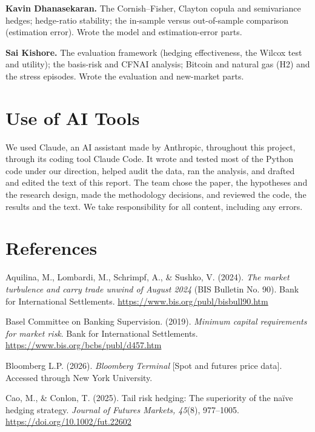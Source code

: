 \documentclass[11pt,letterpaper]{article}
\begin{document}
\textbf{Kavin Dhanasekaran.} The Cornish–Fisher, Clayton copula and semivariance hedges; hedge-ratio stability; the in-sample versus out-of-sample comparison (estimation error). Wrote the model and estimation-error parts.

\textbf{Sai Kishore.} The evaluation framework (hedging effectiveness, the Wilcox test and utility); the basis-risk and CFNAI analysis; Bitcoin and natural gas (H2) and the stress episodes. Wrote the evaluation and new-market parts.

\section*{Use of AI Tools}

We used Claude, an AI assistant made by Anthropic, throughout this project, through its coding tool Claude Code. It wrote and tested most of the Python code under our direction, helped audit the data, ran the analysis, and drafted and edited the text of this report. The team chose the paper, the hypotheses and the research design, made the methodology decisions, and reviewed the code, the results and the text. We take responsibility for all content, including any errors.

\section*{References}

{\small\setlength{\parskip}{0pt}\hangindent=0.3in\noindent Aquilina, M., Lombardi, M., Schrimpf, A., \& Sushko, V. (2024). \textit{The market turbulence and carry trade unwind of August 2024} (BIS Bulletin No. 90). Bank for International Settlements. \url{https://www.bis.org/publ/bisbull90.htm}\par}

{\small\setlength{\parskip}{0pt}\hangindent=0.3in\noindent Basel Committee on Banking Supervision. (2019). \textit{Minimum capital requirements for market risk}. Bank for International Settlements. \url{https://www.bis.org/bcbs/publ/d457.htm}\par}

{\small\setlength{\parskip}{0pt}\hangindent=0.3in\noindent Bloomberg L.P. (2026). \textit{Bloomberg Terminal} [Spot and futures price data]. Accessed through New York University.\par}

{\small\setlength{\parskip}{0pt}\hangindent=0.3in\noindent Cao, M., \& Conlon, T. (2025). Tail risk hedging: The superiority of the naïve hedging strategy. \textit{Journal of Futures Markets, 45}(8), 977–1005. \url{https://doi.org/10.1002/fut.22602}\par}
\end{document}
